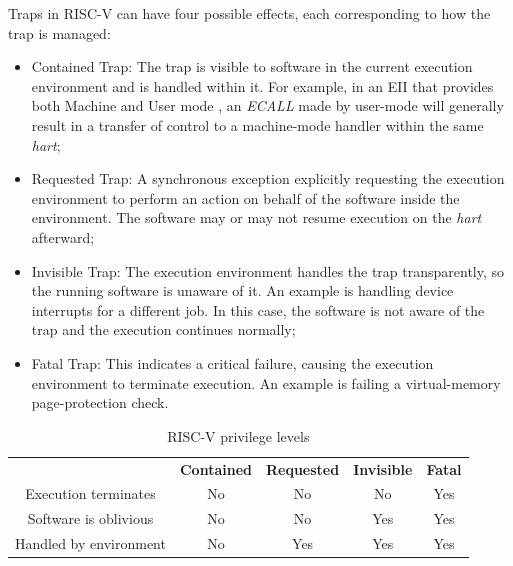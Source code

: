 Traps in RISC-V can have four possible effects, each corresponding to how the trap
is managed:

\begin{itemize}
  \item Contained Trap: The trap is visible to software in the current execution
    environment and is handled within it. For example, in an EII that provides
    both Machine and User mode , an \textit{ECALL} made by user-mode will generally
    result in a transfer of control to a machine-mode handler within the same \textit{hart};

  \item Requested Trap: A synchronous exception explicitly requesting the
    execution environment to perform an action on behalf of the software inside
    the environment. The software may or may not resume execution on the \textit{hart}
    afterward;

  \item Invisible Trap: The execution environment handles the trap transparently,
    so the running software is unaware of it. An example is handling device
    interrupts for a different job. In this case, the software is not aware of
    the trap and the execution continues normally;

  \item Fatal Trap: This indicates a critical failure, causing the execution environment
    to terminate execution. An example is failing a virtual-memory page-protection
    check.
\end{itemize}

\begin{table}
  \centering
  \begin{tabular}{|c|c|c|c|c|}
    \hline
    \textbf{}                           & \textbf{Contained} & \textbf{Requested} & \textbf{Invisible} & \textbf{Fatal} \\
    \hhline{=====} Execution terminates & No                 & No                 & No                 & Yes            \\
    \hline
    Software is oblivious               & No                 & No                 & Yes                & Yes            \\
    \hline
    Handled by environment              & No                 & Yes                & Yes                & Yes            \\
    \hline
  \end{tabular}
  \caption{RISC-V privilege levels}
  \label{tab:traps}
\end{table}

